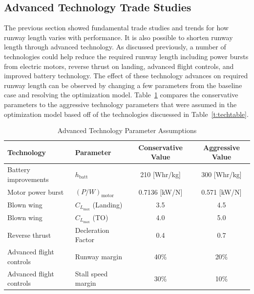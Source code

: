 \documentclass[]{aiaa-tc}%
\begin{document}
\subsection{Advanced Technology Trade Studies}

The previous section showed fundamental trade studies and trends for how runway length varies with performance.  
It is also possible to shorten runway length through advanced technology. 
As discussed previously, a number of technologies could help reduce the required runway length including power bursts from electric motors, reverse thrust on landing, advanced flight controls, and improved battery technology.  
The effect of these technology advances on required runway length can be observed by changing a few parameters from the baseline case and resolving the optimization model.
Table~\ref{t:techparams} compares the conservative parameters to the aggressive technology parameters that were assumed in the optimization model based off of the technologies discuessed in Table~\ref{t:techtable}. 

\begin{table}[H]
    \centering
    \caption{Advanced Technology Parameter Assumptions}
    \label{t:techparams}
    \begin{tabular}{l l c c}
    \toprule
    \toprule
    Technology                  & Parameter                         & Conservative Value  & Aggressive Value \\ \hline
    Battery improvements        & $h_{\mathrm{batt}}$               & 210 [Whr/kg]        & 300 [Whr/kg]\cite{batterytrend}\cite{seeo}     \\
    Motor power burst           & $(P/W)_{\mathrm{motor}}$          & 0.7136 [kW/N]       & 0.571 [kW/N]     \\
    Blown wing                  & $C_{L_{\mathrm{max}}}$ (Landing)  & 3.5                 & 4.5              \\
    Blown wing                  & $C_{L_{\mathrm{max}}}$ (TO)       & 4.0                 & 5.0              \\
    Reverse thrust              & Decleration Factor                & 0.4                 & 0.7              \\
    Advanced flight controls    & Runway margin                     & 40\%                & 20\%             \\
    Advanced flight controls    & Stall speed margin                & 30\%                & 10\%             \\
    \bottomrule
\end{tabular}
\end{table}
\end{document}
